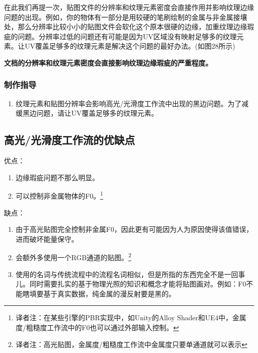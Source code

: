 在此我们再提一次，贴图文件的分辨率和纹理元素密度会直接作用并影响纹理边缘问题的出现。例如，你的物体有一部分是用较硬的笔刷绘制的金属与非金属接壤处，那么分辨率比较小小的贴图文件会软化这个原本很硬的边缘，加重纹理边缘瑕疵的问题。分辨率过低的问题还有可能是因为UV区域没有映射足够多的纹理元素。让UV覆盖足够多的纹理元素是解决这个问题的最好办法。(如图28所示)

\textbf{文档的分辨率和纹理元素密度会直接影响纹理边缘瑕疵的严重程度。}

\subsubsection{制作指导}

\begin{enumerate}
\item 纹理元素和贴图分辨率会影响高光/光滑度工作流中出现的黑边问题。为了减缓黑边问题，请让UV覆盖足够多的纹理元素。
\end{enumerate}

\subsection{高光/光滑度工作流的优缺点}

优点：

\begin{enumerate}
\item 边缘瑕疵问题不那么明显。
\item 可以控制非金属物体的F0。\footnote{译者注：在某些引擎的PBR实现中，如Unity的Alloy Shader和UE4中，金属度/粗糙度工作流中的F0也可以通过外部输入控制。}
\end{enumerate}

缺点：

\begin{enumerate}
\item 由于高光贴图完全控制非金属F0，因此更有可能因为人为原因使得该值错误，进而破坏能量保守。
\item 会额外多使用一个RGB通道的贴图。\footnote{译者注：高光贴图，金属度/粗糙度工作流中金属度只要单通道就可以表示}
\item 使用的名词与传统流程中的流程名词相似，但是所指的东西完全不是一回事儿。同时需要扎实的基于物理光照的知识和概念才能将贴图画对。例如：F0不能瞎填要基于真实数据，纯金属的漫反射要是黑的。
\end{enumerate}